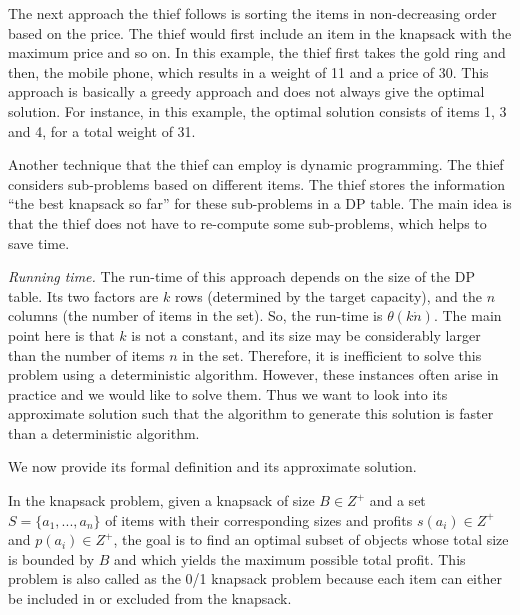The next approach the thief follows is sorting the items in non-decreasing order based on the price.
The thief would first include an item in the knapsack with the maximum price and so on.
In this example, the thief first takes the gold ring and then, the mobile phone, which results in a weight of 11 and a price of 30.
This approach is basically a greedy approach and does not always give the optimal solution. 
For instance, in this example, the optimal solution consists of items 1, 3 and 4, for a total weight of 31.

Another technique that the thief can employ is dynamic programming. 
The thief considers sub-problems based on different items.
The thief stores the information ``the best knapsack so far'' for these sub-problems in a DP table.
The main idea is that the thief does not have to re-compute some sub-problems, which helps to save time.


\textit{Running time.} The run-time of this approach depends on the size of the DP table. 
Its two factors are $k$ rows (determined by the target capacity), and the $n$ columns (the number of items in the set). So, the run-time is $\theta(k \dot n)$. 
The main point here is that $k$ is not a constant, and its size may be considerably larger than the number of items $n$ in the set. 
Therefore, it is inefficient to solve this problem using a deterministic algorithm.
However, these instances often arise in practice and we would like to solve them. 
Thus we want to look into its approximate solution such that the algorithm to generate this solution is faster than a deterministic algorithm.

We now provide its formal definition and its approximate solution.

In the knapsack problem, given a knapsack of size $B \in Z^+$ and a set $S = \{a_1, . . . , a_n\}$
of items with their corresponding sizes and profits $s(a_i) \in Z^+$ and $p(a_i) \in Z^+$, the goal is to find
an optimal subset of objects whose total size is bounded by $B$ and which yields the maximum possible
total profit. This problem is also called as the 0/1 knapsack problem because each
item can either be included in or excluded from the knapsack. 

